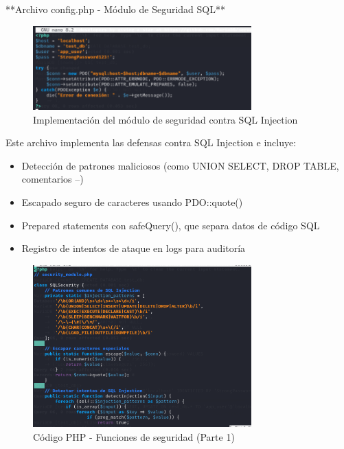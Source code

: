 \documentclass[12pt,a4paper]{article}
\begin{document}
**Archivo config.php - Módulo de Seguridad SQL**

\begin{figure}[H]
    \centering
    \includegraphics[width=0.75\textwidth]{./assets/img4.png}
    \caption{Implementación del módulo de seguridad contra SQL Injection}
    \label{fig:config-seguridad}
\end{figure}

Este archivo implementa las defensas contra SQL Injection e incluye:

\begin{itemize}
    \item Detección de patrones maliciosos (como UNION SELECT, DROP TABLE, comentarios
          --)
    \item Escapado seguro de caracteres usando PDO::quote()
    \item Prepared statements con safeQuery(), que separa datos de código SQL
    \item Registro de intentos de ataque en logs para auditoría
\end{itemize}

\begin{figure}[H]
    \centering
    \includegraphics[width=0.75\textwidth]{./assets/img5.png}
    \caption{Código PHP - Funciones de seguridad (Parte 1)}
    \label{fig:php-seguridad-1}
\end{figure}
\end{document}
